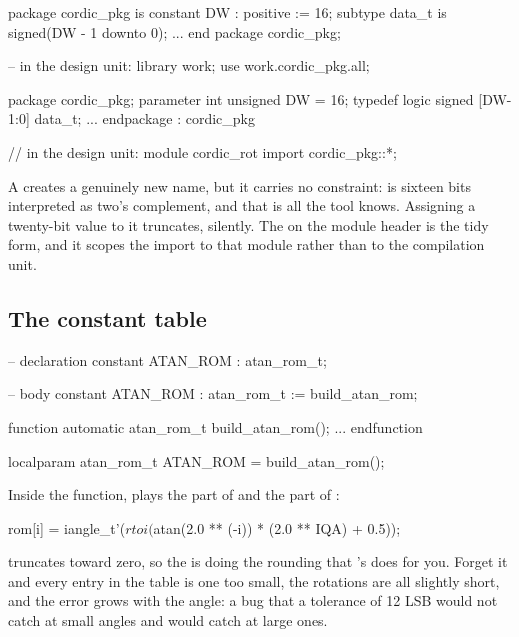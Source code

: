 \begin{rosetta}
\begin{rleft}
package cordic_pkg is
  constant DW : positive := 16;
  subtype data_t is
    signed(DW - 1 downto 0);
  ...
end package cordic_pkg;

-- in the design unit:
library work;
  use work.cordic_pkg.all;
\end{rleft}
\begin{rright}
package cordic_pkg;
  parameter int unsigned DW = 16;
  typedef logic signed [DW-1:0]
          data_t;
  ...
endpackage : cordic_pkg

// in the design unit:
module cordic_rot
  import cordic_pkg::*;
\end{rright}
\end{rosetta}

A  creates a genuinely new name, but it carries no constraint:
 is sixteen bits interpreted as two's complement, and that is
all the tool knows. Assigning a twenty-bit value to it truncates, silently.
The  on the module header is the tidy form, and it scopes the
import to that module rather than to the compilation unit.

\subsection{The constant table}

\begin{rosetta}
\begin{rleft}
-- declaration
constant ATAN_ROM : atan_rom_t;

-- body
constant ATAN_ROM : atan_rom_t
  := build_atan_rom;
\end{rleft}
\begin{rright}
function automatic atan_rom_t
    build_atan_rom();
  ...
endfunction

localparam atan_rom_t ATAN_ROM
  = build_atan_rom();
\end{rright}
\end{rosetta}

Inside the function,  plays the part of  and
 the part of :

\begin{svcode}
rom[i] = iangle_t'($rtoi($atan(2.0 ** (-i)) * (2.0 ** IQA) + 0.5));
\end{svcode}

 truncates toward zero, so the  is doing the
rounding that \VHDL{}'s  does for you. Forget it and every entry
in the table is one too small, the rotations are all slightly short, and the
error grows with the angle: a bug that a tolerance of 12 LSB would not catch
at small angles and would catch at large ones.

